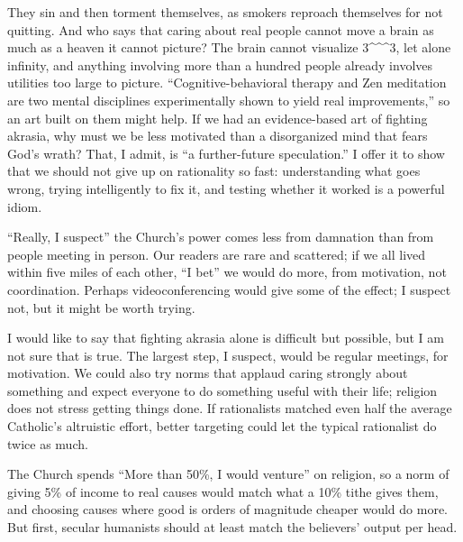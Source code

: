 They sin and then torment themselves, as smokers reproach themselves for not quitting. And who says that caring about real people cannot move a brain as much as a heaven it cannot picture? The brain cannot visualize 3\^{}\^{}\^{}3, let alone infinity, and anything involving more than a hundred people already involves utilities too large to picture. ``Cognitive-behavioral therapy and Zen meditation are two mental disciplines experimentally shown to yield real improvements,'' so an art built on them might help.  If we had an evidence-based art of fighting akrasia, why must we be less motivated than a disorganized mind that fears God's wrath? That, I admit, is ``a further-future speculation.'' I offer it to show that we should not give up on rationality so fast: understanding what goes wrong, trying intelligently to fix it, and testing whether it worked is a powerful idiom.

``Really, I suspect'' the Church's power comes less from damnation than from people meeting in person.  Our readers are rare and scattered; if we all lived within five miles of each other, ``I bet'' we would do more, from motivation, not coordination. Perhaps videoconferencing would give some of the effect; I suspect not, but it might be worth trying.

I would like to say that fighting akrasia alone is difficult but possible, but I am not sure that is true. The largest step, I suspect, would be regular meetings, for motivation. We could also try norms that applaud caring strongly about something and expect everyone to do something useful with their life; religion does not stress getting things done. If rationalists matched even half the average Catholic's altruistic effort, better targeting could let the typical rationalist do twice as much.

The Church spends ``More than 50\%, I would venture'' on religion, so a norm of giving 5\% of income to real causes would match what a 10\% tithe gives them, and choosing causes where good is orders of magnitude cheaper would do more.  But first, secular humanists should at least match the believers' output per head.
